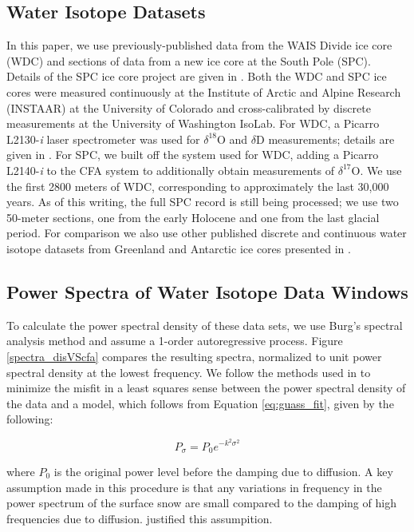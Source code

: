 \documentclass[draft, jgrga]{AGUTeX}
\begin{document}
\begin{article}
\subsection{Water Isotope Datasets}
In this paper, we use previously-published data from the WAIS Divide ice core (WDC) \citep{Jones2017b} and sections of data from a new ice core at the South Pole (SPC). Details of the SPC ice core project are given in \citet{Casey2014}. Both the WDC and SPC ice cores were measured continuously at the Institute of Arctic and Alpine Research (INSTAAR) at the University of Colorado and cross-calibrated by discrete measurements at the University of Washington IsoLab. For WDC, a Picarro L2130-\textit{i} laser spectrometer was used for $\delta^{18}$O and $\delta$D measurements; details are given in \citet{Jones2017b}.  For SPC, we built off the system used for WDC, adding a Picarro L2140-\textit{i} \citep{Steig2014} to the CFA system to additionally obtain measurements of $\delta^{17}$O. We use the first 2800 meters of WDC, corresponding to approximately the last 30,000 years. As of this writing, the full SPC record is still being processed; we use two 50-meter sections, one from the early Holocene and one from the last glacial period. For comparison we also use other published discrete and continuous water isotope datasets from Greenland and Antarctic ice cores presented in \citet{Oerter2004,Gkinis2011a,Steig2013,Svensson2015,Holme2017}.

\subsection{Power Spectra of Water Isotope Data Windows}
To calculate the power spectral density of these data sets, we use Burg's spectral analysis method and assume a 1-order autoregressive process. Figure \ref{spectra_disVScfa} compares the resulting spectra, normalized to unit power spectral density at the lowest frequency. We follow the methods used in \citet{Gkinis2014} to minimize the misfit in a least squares sense between the power spectral density of the data and a model, which follows from Equation \ref{eq:guass_fit}, given by the following:

\begin{equation}
  \label{exp_model}
  P_\sigma=P_0e^{-k^2\sigma^2}
\end{equation}

where $P_0$ is the original power level before the damping due to diffusion. A key assumption made in this procedure is that any variations in frequency in the power spectrum of the surface snow are small compared to the damping of high frequencies due to diffusion. \citep{Gkinis2014} justified this assumpition.


\end{article}
\end{document}
